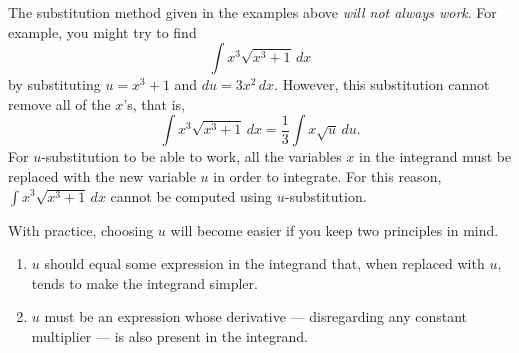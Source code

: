 \documentclass{book}
\newcommand{\dx}{\,dx}
\newcommand{\du}{\,du}
\newcommand{\dint}{\displaystyle \int}
\begin{document}
The substitution method given in the examples above \emph{will not always work}. For example, you might try to find \[\int x^3\sqrt{x^3+1}\dx\] by substituting $u = x^3+1$ and $du = 3x^2\dx$. However, this substitution cannot remove all of the $x$'s, that is, \[\int x^3\sqrt{x^3+1}\dx = \dfrac{1}{3}\int x \sqrt{u}\du.\] For $u$-substitution to be able to work, all the variables $x$ in the integrand must be replaced with the new variable $u$ in order to integrate. For this reason, $\dint x^3\sqrt{x^3+1}\dx$ cannot be computed using $u$-substitution. 

With practice, choosing $u$ will become easier if you keep two principles in mind.
\begin{enumerate}[!THM!,start=1]
\item $u$ should equal some expression in the integrand that, when replaced with $u$, tends to make the integrand simpler.

\item $u$ must be an expression whose derivative --- disregarding any constant multiplier --- is also present in the integrand.
\end{enumerate}
\end{document}
